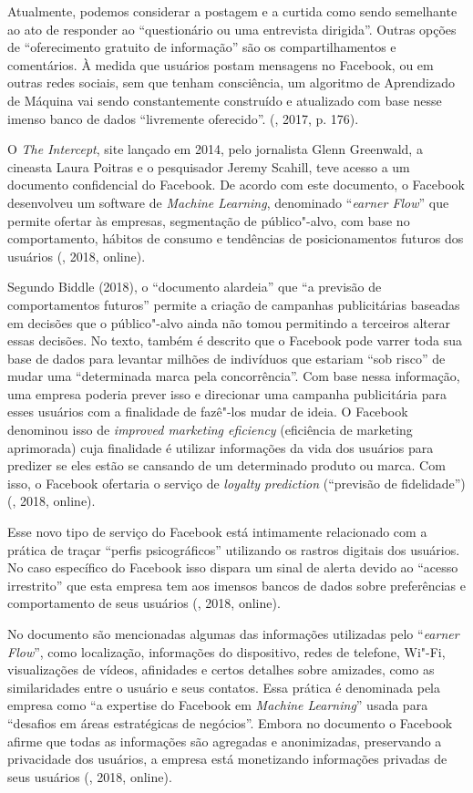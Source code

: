 Atualmente, podemos considerar a postagem e a curtida como sendo
semelhante ao ato de responder ao ``questionário ou uma entrevista
dirigida''. Outras opções de ``oferecimento gratuito de informação'' são
os compartilhamentos e comentários. À medida que usuários postam
mensagens no Facebook, ou em outras redes sociais, sem que tenham
consciência, um algoritmo de Aprendizado de Máquina vai sendo
constantemente construído e atualizado com base nesse imenso banco de
dados ``livremente oferecido''. (, 2017, p. 176).

O \emph{The Intercept}, site lançado em 2014, pelo jornalista Glenn
Greenwald, a cineasta Laura Poitras e o pesquisador Jeremy Scahill, teve
acesso a um documento confidencial do Facebook. De acordo com este
documento, o Facebook desenvolveu um software de \emph{Machine
Learning}, denominado ``\emph{earner Flow}'' que permite ofertar às
empresas, segmentação de público"-alvo, com base no comportamento,
hábitos de consumo e tendências de posicionamentos futuros dos usuários
(, 2018, online).

Segundo Biddle (2018), o ``documento alardeia'' que ``a previsão de
comportamentos futuros'' permite a criação de campanhas publicitárias
baseadas em decisões que o público"-alvo ainda não tomou permitindo a
terceiros alterar essas decisões. No texto, também é descrito que o
Facebook pode varrer toda sua base de dados para levantar milhões de
indivíduos que estariam ``sob risco'' de mudar uma ``determinada marca
pela concorrência''. Com base nessa informação, uma empresa poderia
prever isso e direcionar uma campanha publicitária para esses usuários
com a finalidade de fazê"-los mudar de ideia.
O Facebook denominou isso de \emph{improved marketing eficiency} (eficiência de marketing
aprimorada) cuja finalidade é utilizar informações da vida dos usuários
para predizer se eles estão se cansando de um determinado produto ou
marca. Com isso, o Facebook ofertaria o serviço de \emph{loyalty
prediction} (``previsão de fidelidade'') (, 2018, online).

Esse novo tipo de serviço do Facebook está intimamente relacionado com a
prática de traçar ``perfis psicográficos'' utilizando os rastros
digitais dos usuários. No caso específico do Facebook isso dispara um
sinal de alerta devido ao ``acesso irrestrito'' que esta empresa tem aos
imensos bancos de dados sobre preferências e comportamento de seus
usuários (, 2018, online).

No documento são mencionadas algumas das informações utilizadas pelo
``\emph{earner Flow}'', como localização, informações do dispositivo,
redes de telefone, Wi"-Fi, visualizações de vídeos, afinidades e certos
detalhes sobre amizades, como as similaridades entre o usuário e seus
contatos. Essa prática é denominada pela empresa como ``a expertise do
Facebook em \emph{Machine Learning}'' usada para ``desafios em áreas
estratégicas de negócios''. Embora no documento o Facebook afirme que
todas as informações são agregadas e anonimizadas, preservando a
privacidade dos usuários, a empresa está monetizando informações
privadas de seus usuários (, 2018, online).

